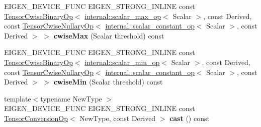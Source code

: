 \begin{DoxyCompactItemize}
\item 
\mbox{\label{class_eigen_1_1_tensor_base_3_01_derived_00_01_read_only_accessors_01_4_a124f4681e8898f50d61cce0843ea84ad}} 
E\+I\+G\+E\+N\+\_\+\+D\+E\+V\+I\+C\+E\+\_\+\+F\+U\+NC E\+I\+G\+E\+N\+\_\+\+S\+T\+R\+O\+N\+G\+\_\+\+I\+N\+L\+I\+NE const \hyperlink{class_eigen_1_1_tensor_cwise_binary_op}{Tensor\+Cwise\+Binary\+Op}$<$ \hyperlink{struct_eigen_1_1internal_1_1scalar__max__op}{internal\+::scalar\+\_\+max\+\_\+op}$<$ Scalar $>$, const Derived, const \hyperlink{class_eigen_1_1_tensor_cwise_nullary_op}{Tensor\+Cwise\+Nullary\+Op}$<$ \hyperlink{struct_eigen_1_1internal_1_1scalar__constant__op}{internal\+::scalar\+\_\+constant\+\_\+op}$<$ Scalar $>$, const Derived $>$ $>$ {\bfseries cwise\+Max} (Scalar threshold) const
\item 
\mbox{\label{class_eigen_1_1_tensor_base_3_01_derived_00_01_read_only_accessors_01_4_aef6928f6f1ab5f537b7a24cfc20a6841}} 
E\+I\+G\+E\+N\+\_\+\+D\+E\+V\+I\+C\+E\+\_\+\+F\+U\+NC E\+I\+G\+E\+N\+\_\+\+S\+T\+R\+O\+N\+G\+\_\+\+I\+N\+L\+I\+NE const \hyperlink{class_eigen_1_1_tensor_cwise_binary_op}{Tensor\+Cwise\+Binary\+Op}$<$ \hyperlink{struct_eigen_1_1internal_1_1scalar__min__op}{internal\+::scalar\+\_\+min\+\_\+op}$<$ Scalar $>$, const Derived, const \hyperlink{class_eigen_1_1_tensor_cwise_nullary_op}{Tensor\+Cwise\+Nullary\+Op}$<$ \hyperlink{struct_eigen_1_1internal_1_1scalar__constant__op}{internal\+::scalar\+\_\+constant\+\_\+op}$<$ Scalar $>$, const Derived $>$ $>$ {\bfseries cwise\+Min} (Scalar threshold) const
\item 
\mbox{\label{class_eigen_1_1_tensor_base_3_01_derived_00_01_read_only_accessors_01_4_a2fce90adee2d64f26119db371d5c1f3f}} 
{\footnotesize template$<$typename New\+Type $>$ }\\E\+I\+G\+E\+N\+\_\+\+D\+E\+V\+I\+C\+E\+\_\+\+F\+U\+NC E\+I\+G\+E\+N\+\_\+\+S\+T\+R\+O\+N\+G\+\_\+\+I\+N\+L\+I\+NE const \hyperlink{class_eigen_1_1_tensor_conversion_op}{Tensor\+Conversion\+Op}$<$ New\+Type, const Derived $>$ {\bfseries cast} () const
\item 
\mbox{\label{class_eigen_1_1_tensor_base_3_01_derived_00_01_read_only_accessors_01_4_a25854dd66243131400dcfadf296144a7}} 

\end{DoxyCompactItemize}

